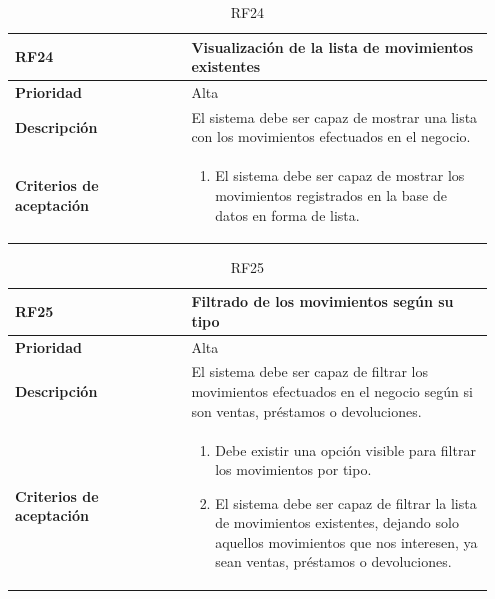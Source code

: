 \begin{table}[H]
	\centering %
	\begin{tabular}{|p{0.35\linewidth}|p{0.6\linewidth}|}
		\hline
		\rowcolor{grayshade} \textbf{RF24} & \textbf{Visualización de la lista de movimientos existentes} \\
		\hline
		\textbf{Prioridad} & Alta \\
		\hline
		\textbf{Descripción} & El sistema debe ser capaz de mostrar una lista con los movimientos efectuados en el negocio.\\
		\hline
		\vspace{0.5mm}
		\textbf{Criterios de aceptación} & 
		\begin{minipage}[t]{0.9\linewidth}
			\begin{enumerate}
				\item El sistema debe ser capaz de mostrar los movimientos registrados en la base de datos en forma de lista.  
			\end{enumerate}
			\vspace{2mm}
		\end{minipage} \\
		\hline
	\end{tabular}
	\caption{RF24}
\end{table}

\begin{table}[H]
	\centering %
	\begin{tabular}{|p{0.35\linewidth}|p{0.6\linewidth}|}
		\hline
		\rowcolor{grayshade} \textbf{RF25} & \textbf{Filtrado de los movimientos según su tipo} \\
		\hline
		\textbf{Prioridad} & Alta \\
		\hline
		\textbf{Descripción} & El sistema debe ser capaz de filtrar los movimientos efectuados en el negocio según si son ventas, préstamos o devoluciones.\\
		\hline
		\vspace{0.5mm}
		\textbf{Criterios de aceptación} & 
		\begin{minipage}[t]{0.9\linewidth}
			\begin{enumerate}
				\item Debe existir una opción visible para filtrar los movimientos por tipo.
				\item El sistema debe ser capaz de filtrar la lista de movimientos existentes, dejando solo aquellos movimientos que nos interesen, ya sean ventas, préstamos o devoluciones.  
			\end{enumerate}
			\vspace{2mm}
		\end{minipage} \\
		\hline
	\end{tabular}
	\caption{RF25}
\end{table}


